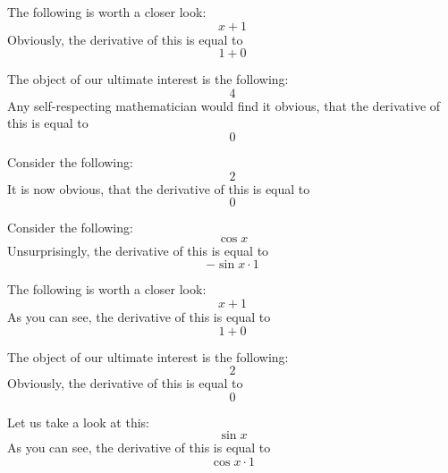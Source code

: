 \documentclass{article}
\begin{document}
The following is worth a closer look:
\begin{equation}
x + 1 
\end{equation}
Obviously, the derivative of this is equal to
\begin{equation}
1 + 0 
\end{equation}

The object of our ultimate interest is the following:
\begin{equation}
4 
\end{equation}
Any self-respecting mathematician would find it obvious, that the derivative of this is equal to
\begin{equation}
0 
\end{equation}

Consider the following:
\begin{equation}
2 
\end{equation}
It is now obvious, that the derivative of this is equal to
\begin{equation}
0 
\end{equation}

Consider the following:
\begin{equation}
\cos x 
\end{equation}
Unsurprisingly, the derivative of this is equal to
\begin{equation}
-\sin x \cdot 1 
\end{equation}

The following is worth a closer look:
\begin{equation}
x + 1 
\end{equation}
As you can see, the derivative of this is equal to
\begin{equation}
1 + 0 
\end{equation}

The object of our ultimate interest is the following:
\begin{equation}
2 
\end{equation}
Obviously, the derivative of this is equal to
\begin{equation}
0 
\end{equation}

Let us take a look at this:
\begin{equation}
\sin x 
\end{equation}
As you can see, the derivative of this is equal to
\begin{equation}
\cos x \cdot 1 
\end{equation}
\end{document}
